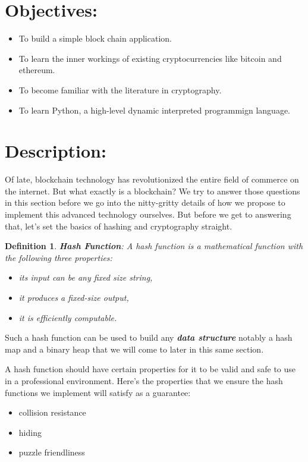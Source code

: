 \documentclass[a4paper, 12pt]{article}
\newtheorem{definition}{Definition}
\begin{document}
\newpage

\tableofcontents

\newpage 
\pagestyle{fancy}
\fancyhead[L]{}
\renewcommand{\headrulewidth}{0pt}
\renewcommand{\footrulewidth}{0pt}

\section{Objectives: }
\begin{itemize}
    \item To build a simple block chain application.
    \item To learn the inner workings of existing cryptocurrencies like bitcoin and ethereum.
    \item To become familiar with the literature in cryptography.
    \item To learn Python, a high-level dynamic interpreted programmign language. 
\end{itemize}

\section{Description:}
Of late, blockchain technology has revolutionized the entire field of commerce on the internet. But what exactly is a blockchain? 
We try to answer those questions in this section before we go into the nitty-gritty details of how we propose to implement this advanced technology ourselves. But before we get to answering that, let's set the basics of hashing and cryptography straight. 

\begin{definition}
    \textbf{Hash Function}: A \emph{hash function} is a mathematical function with the following three properties: 
    \begin{itemize}
        \item its input can be any fixed size string,
        \item it produces a fixed-size output,
        \item it is efficiently computable.
    \end{itemize}
\end{definition}

Such a hash function can be used to build any \textbf{\emph{data structure}} notably a hash map and a binary heap that we will come to later in this same section. 

A hash function should have certain properties for it to be valid and safe to use in a professional environment. Here's the properties that we ensure the hash functions we implement will satisfy as a guarantee: 
\begin{itemize}
    \item collision resistance
    \item hiding
    \item puzzle friendliness
\end{itemize}
\end{document}
